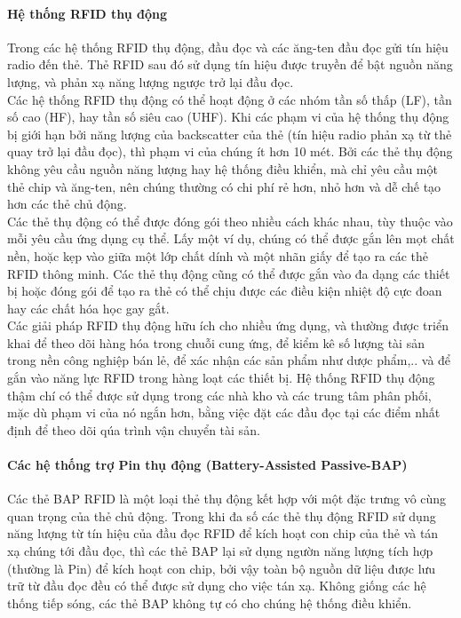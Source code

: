 \paragraph{Hệ thống RFID thụ động}
Trong các hệ thống RFID thụ động,  đầu đọc và các ăng-ten đầu đọc gửi tín hiệu radio đến thẻ. Thẻ RFID sau đó sử dụng tín hiệu được truyền để bật nguồn năng lượng,  và phản xạ năng lượng ngược trở lại đầu đọc.\\
Các hệ thống RFID thụ động có thể hoạt động ở các nhóm  tần số thấp (LF), tần số cao (HF), hay tần số siêu cao (UHF). Khi các phạm vi của hệ thống thụ động bị giới hạn bởi năng lượng của backscatter của thẻ (tín hiệu radio phản xạ từ thẻ quay trở lại đầu đọc), thì phạm vi của chúng ít hơn 10 mét. Bởi các thẻ thụ động không yêu cầu nguồn năng lượng hay hệ thống điều khiển, mà chỉ yêu cầu một thẻ chip và ăng-ten, nên chúng thường có chi phí rẻ hơn, nhỏ hơn và dễ chế tạo hơn các thẻ chủ động.\\
Các thẻ thụ động có thể được đóng gói theo nhiều cách khác nhau, tùy thuộc vào mỗi yêu cầu ứng dụng cụ thể. Lấy một ví dụ, chúng có thể được gắn lên mọt chất nền,  hoặc kẹp vào giữa một lớp chất dính và một nhãn giấy để tạo ra các thẻ RFID thông minh. Các thẻ thụ động cũng có thể được gắn vào đa dạng các thiết bị hoặc đóng gói để tạo ra thẻ có thể chịu được các điều kiện nhiệt độ cực đoan hay các chất hóa học gay gắt.\\
Các giải pháp RFID thụ động hữu ích cho nhiều ứng dụng, và thường được triển khai để theo dõi hàng hóa trong chuỗi cung ứng, để kiểm kê số lượng tài sản trong nền công nghiệp bán lẻ, để xác nhận các sản phẩm như dược phẩm,.. và để gắn vào năng lực RFID trong hàng loạt các thiết bị. Hệ thống RFID thụ động thậm chí có thể được sử dụng trong các nhà kho và các trung tâm phân phối, mặc dù phạm vi của nó ngắn hơn, bằng việc đặt các đầu đọc tại các điểm nhất định để theo dõi qúa trình vận chuyển tài sản.
\paragraph{Các hệ thống trợ Pin thụ động (Battery-Assisted Passive-BAP)}
Các thẻ BAP RFID là một loại thẻ thụ động  kết hợp với một đặc trưng vô cùng quan trọng của thẻ chủ động. Trong khi đa số các thẻ thụ động RFID sử dụng năng lượng từ tín hiệu của đầu đọc RFID để kích hoạt con chip của thẻ và tán xạ chúng tới đầu đọc, thì  các thẻ BAP lại sử dụng ngườn năng lượng tích hợp (thường là Pin) để kích hoạt con chip, bởi vậy toàn bộ nguồn dữ liệu được lưu trữ từ đầu đọc đều có thể được sử dụng cho việc tán xạ. Không giống các hệ thống tiếp sóng,  các thẻ BAP không tự có cho chúng hệ thống điều khiển.
\label{ref{fig2_8}}

